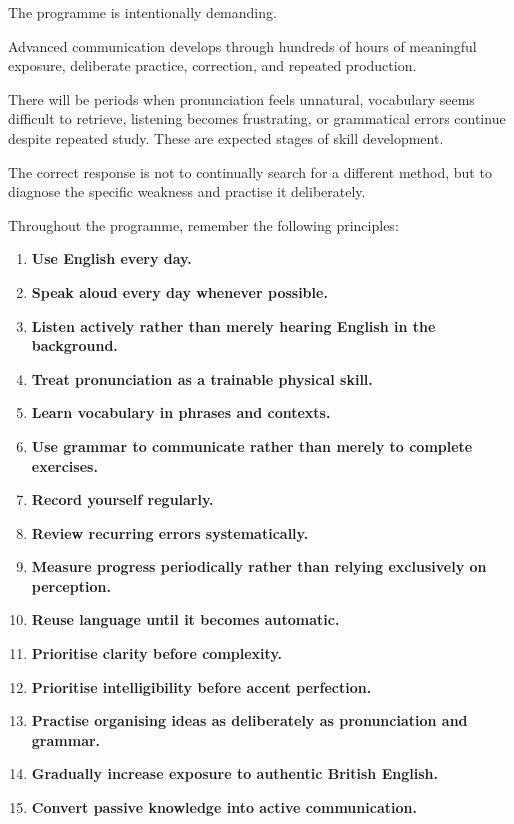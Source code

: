 The programme is intentionally demanding.

Advanced communication develops through hundreds of hours of meaningful exposure, deliberate practice, correction, and repeated production.

There will be periods when pronunciation feels unnatural, vocabulary seems difficult to retrieve, listening becomes frustrating, or grammatical errors continue despite repeated study. These are expected stages of skill development.

The correct response is not to continually search for a different method, but to diagnose the specific weakness and practise it deliberately.

Throughout the programme, remember the following principles:

\begin{enumerate}
    \item \textbf{Use English every day.}

    \item \textbf{Speak aloud every day whenever possible.}

    \item \textbf{Listen actively rather than merely hearing English in the background.}

    \item \textbf{Treat pronunciation as a trainable physical skill.}

    \item \textbf{Learn vocabulary in phrases and contexts.}

    \item \textbf{Use grammar to communicate rather than merely to complete exercises.}

    \item \textbf{Record yourself regularly.}

    \item \textbf{Review recurring errors systematically.}

    \item \textbf{Measure progress periodically rather than relying exclusively on perception.}

    \item \textbf{Reuse language until it becomes automatic.}

    \item \textbf{Prioritise clarity before complexity.}

    \item \textbf{Prioritise intelligibility before accent perfection.}

    \item \textbf{Practise organising ideas as deliberately as pronunciation and grammar.}

    \item \textbf{Gradually increase exposure to authentic British English.}

    \item \textbf{Convert passive knowledge into active communication.}
\end{enumerate}

